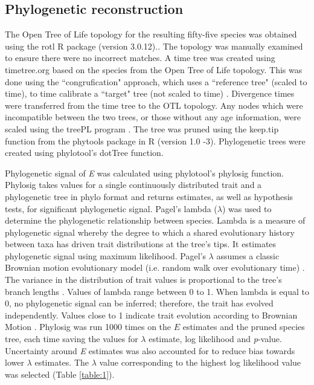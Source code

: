 \documentclass[11pt]{article}
\begin{document}
\begin{flushleft}
\subsection{Phylogenetic reconstruction}
The Open Tree of Life topology \citep{hinchliff2015synthesis} for the resulting fifty-five species was obtained using the rotl R package (version 3.0.12).\citep{michonneau2016rotl}. The topology was manually examined to ensure there were no incorrect matches. A time tree was created using timetree.org based on the species from the Open Tree of Life topology. This was done using the “congrufication" approach, which uses a “reference tree" (scaled to time), to time calibrate a “target" tree (not scaled to time) \citep{eastman2013congruification}. Divergence times were transferred from the time tree to the OTL topology. Any nodes which were incompatible between the two trees, or those without any age information, were scaled using the treePL program \citep{smith2012treepl}. The tree was pruned using the keep.tip function from the phytools package in R (version 1.0 -3). Phylogenetic trees were created using phylotool’s dotTree function. 
\linebreak

Phylogenetic signal of \emph{E} was calculated using phylotool’s phylosig function. Phylosig takes values for a single continuously distributed trait and a phylogenetic tree in phylo format and returns estimates, as well as hypothesis tests, for significant phylogenetic signal. Pagel’s lambda ($\lambda$) was used to determine the phylogenetic relationship between species. Lambda is a measure of phylogenetic signal whereby the degree to which a shared evolutionary history between taxa has driven trait distributions at the tree’s tips. It estimates phylogenetic signal using maximum likelihood. Pagel’s  $\lambda$ assumes a classic Brownian motion evolutionary model (i.e. random walk over evolutionary time) \citep{molina2017revisiting,munkemuller2012measure,pagel1999inferring}. The variance in the distribution of trait values is proportional to the tree’s branch lengths \citep{munkemuller2012measure}. Values of lambda range between 0 to 1. When lambda is equal to 0, no phylogenetic signal can be inferred; therefore, the trait has evolved independently. Values close to 1 indicate trait evolution according to Brownian Motion \citep{molina2017revisiting,munkemuller2012measure}. Phylosig was run 1000 times on the \emph{$E$} estimates and the pruned species tree, each time saving the values for  $\lambda$ estimate, log likelihood and \emph{p}-value. Uncertainty around \emph{E} estimates was also accounted for to reduce bias towards lower $\lambda$ estimates. The $\lambda$ value corresponding to the highest log likelihood value was selected (Table \ref{table:1}).
\linebreak


\end{flushleft}
\end{document}
